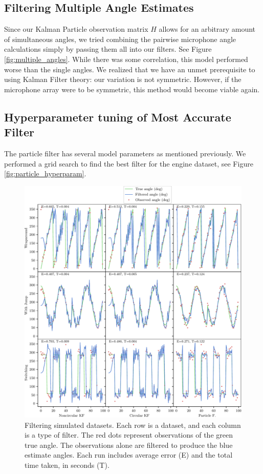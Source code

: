 \documentclass[11pt]{amsart}
\begin{document}
\subsection{Filtering Multiple Angle Estimates}

Since our Kalman Particle observation matrix $H$ allows for an arbitrary amount of 
simultaneous angles, we tried combining the pairwise microphone angle 
calculations simply by passing them all into our filters. 
See Figure \ref{fig:multiple_angles}. 
While there was some correlation, this model performed worse than the single angles.
 We realized that we have an unmet prerequisite to using Kalman Filter theory: our
variation is not symmetric. However, 
if the microphone array were to be symmetric, this method would become viable again.

\subsection{Hyperparameter tuning of Most Accurate Filter}

The particle filter has several model parameters as mentioned previously. We performed a grid search
to find the best filter for the engine dataset, see Figure \ref{fig:particle_hyperparam}.


\begin{figure}[htp]
    \centering
    \includegraphics[width=.95\textwidth]{actual_paper_graphs/all_simulated.pdf}\hfill
    \caption{
        Filtering simulated datasets. Each row is a dataset, 
        and each column is a type of filter.
        The red dots represent observations of the green true angle. 
        The observations alone are filtered to produce the blue estimate angles.
        Each run includes average error (E) and the total time taken, in seconds (T).
        }
    \label{fig:all_simulated}
\end{figure}
\end{document}
